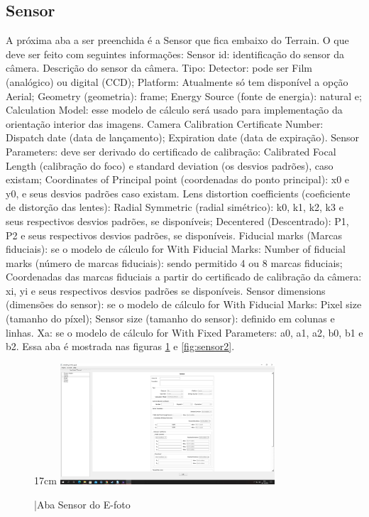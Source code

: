 \subsection{Sensor}
A próxima aba a ser preenchida é a Sensor que fica embaixo do Terrain. O que deve ser feito com seguintes informações: Sensor id: identificação do sensor da câmera. Descrição do sensor da câmera. Tipo: Detector: pode ser Film (analógico) ou digital (CCD); Platform: Atualmente só tem disponível a opção Aerial; Geometry (geometria): frame; Energy Source (fonte de energia): natural e; Calculation Model: esse modelo de cálculo será usado para implementação da orientação interior das imagens. Camera Calibration Certificate Number: Dispatch date (data de lançamento); Expiration date (data de expiração). Sensor Parameters: deve ser derivado do certificado de calibração: Calibrated Focal Length (calibração do foco) e standard deviation (os desvios padrões), caso existam; Coordinates of Principal point (coordenadas do ponto principal): x0 e y0, e seus desvios padrões caso existam. Lens distortion coefficients (coeficiente de distorção das lentes): Radial Symmetric (radial simétrico): k0, k1, k2, k3 e seus respectivos desvios padrões, se disponíveis; Decentered (Descentrado): P1, P2 e seus respectivos desvios padrões, se disponíveis. Fiducial marks (Marcas fiduciais): se o modelo de cálculo for With Fiducial Marks: Number of fiducial marks (número de marcas fiduciais): sendo permitido 4 ou 8 marcas fiduciais; Coordenadas das marcas fiduciais a partir do certificado de calibração da câmera: xi, yi e seus respectivos desvios padrões se disponíveis. Sensor dimensions (dimensões do sensor): se o modelo de cálculo for With Fiducial Marks: Pixel size (tamanho do píxel); Sensor size (tamanho do sensor): definido em colunas e linhas. Xa: se o modelo de cálculo for With Fixed Parameters: a0, a1, a2, b0, b1 e b2. Essa aba é mostrada nas figuras \ref{fig:sensor1} e \ref{fig:sensor2}.

\begin{figure}[!ht]{17cm}
	\includegraphics[width=8cm, center]{figuras/sensor1.jpg}
	\caption{|Aba Sensor do E-foto} \label{fig:sensor1}
\end{figure}


